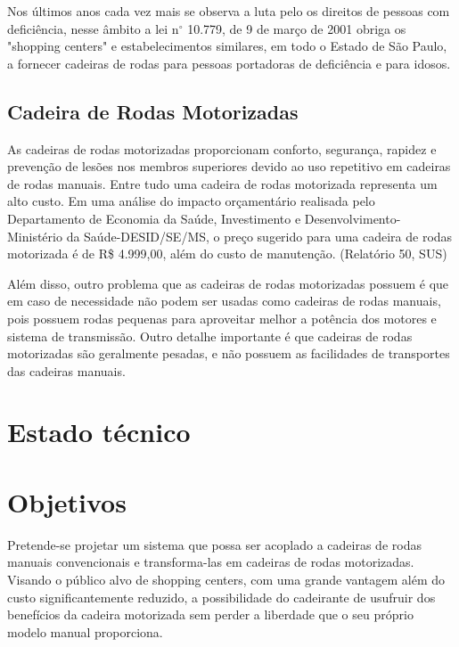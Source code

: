 Nos últimos anos cada vez mais se observa a luta pelo os direitos de pessoas com deficiência, nesse âmbito a lei n$^{\circ}$ 10.779, de 9 de março de 2001 obriga os "shopping centers" e estabelecimentos similares, em todo o Estado de São Paulo, a fornecer cadeiras de rodas para pessoas portadoras de deficiência e para idosos. 

\subsection{Cadeira de Rodas Motorizadas}

As cadeiras de rodas motorizadas proporcionam conforto, segurança, rapidez e prevenção de lesões nos membros superiores devido ao uso repetitivo em cadeiras de rodas manuais. Entre tudo uma cadeira de rodas motorizada representa um alto custo. Em uma análise do impacto orçamentário realisada pelo Departamento de Economia da Saúde, Investimento e Desenvolvimento- Ministério da Saúde-DESID/SE/MS, o preço sugerido para uma cadeira de rodas motorizada é de R\$ 4.999,00, além do custo de manutenção. (Relatório 50, SUS)

Além disso, outro problema que as cadeiras de rodas motorizadas possuem é que em caso de necessidade não podem ser usadas como cadeiras de rodas manuais, pois possuem rodas pequenas para aproveitar melhor a potência dos motores e sistema de transmissão. Outro detalhe importante é que cadeiras de rodas motorizadas são geralmente pesadas, e não possuem as facilidades de transportes das cadeiras manuais.

\section{Estado técnico}

\section{Objetivos}

Pretende-se projetar um sistema que possa ser acoplado a cadeiras de rodas manuais convencionais e transforma-las em cadeiras de rodas motorizadas. Visando o público alvo de shopping centers, com uma grande vantagem além do custo significantemente reduzido, a possibilidade do cadeirante de usufruir dos benefícios da cadeira motorizada sem perder a liberdade que o seu próprio modelo manual proporciona.
